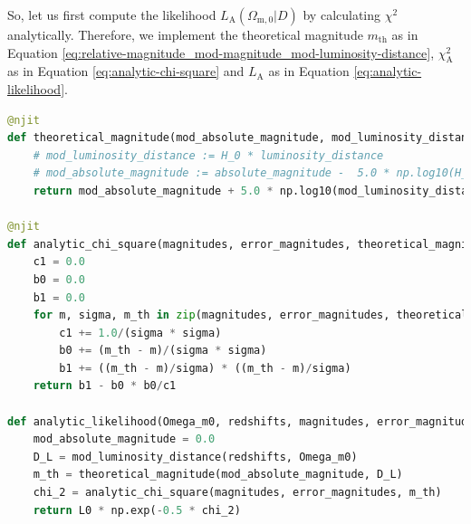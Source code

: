 \noindent So, let us first compute the likelihood $L_{\text{A}}(\Omega_{\text{m},0} \vert D)$ by calculating $\chi^2$ analytically. Therefore, we implement the theoretical magnitude $m_{\text{th}}$ as in Equation \eqref{eq:relative-magnitude_mod-magnitude_mod-luminosity-distance}, $\chi_{\text{A}}^{2}$ as in Equation \eqref{eq:analytic-chi-square} and $L_{\text{A}}$ as in Equation \eqref{eq:analytic-likelihood}.

\begin{lstlisting}[language=Python, caption={Function for $m_{\text{th}}(z, \mathcal{M}, \Omega_{\text{m},0})$, $\chi_{\text{A}}^2(\Omega_{\text{m},0} \vert D)$ and $L_{\text{A}}(\Omega_{\text{m},0} \vert D)$.}, label={lst:MWE-theoretical-magnitude-and-analytic-chi-square-and-analytic-likelihood}]
@njit
def theoretical_magnitude(mod_absolute_magnitude, mod_luminosity_distance):
    # mod_luminosity_distance := H_0 * luminosity_distance
    # mod_absolute_magnitude := absolute_magnitude -  5.0 * np.log10(H_0) + 25.0
    return mod_absolute_magnitude + 5.0 * np.log10(mod_luminosity_distance)

@njit
def analytic_chi_square(magnitudes, error_magnitudes, theoretical_magnitudes):
    c1 = 0.0
    b0 = 0.0
    b1 = 0.0
    for m, sigma, m_th in zip(magnitudes, error_magnitudes, theoretical_magnitudes):
        c1 += 1.0/(sigma * sigma)
        b0 += (m_th - m)/(sigma * sigma)
        b1 += ((m_th - m)/sigma) * ((m_th - m)/sigma)
    return b1 - b0 * b0/c1

def analytic_likelihood(Omega_m0, redshifts, magnitudes, error_magnitudes, L0):
    mod_absolute_magnitude = 0.0
    D_L = mod_luminosity_distance(redshifts, Omega_m0)
    m_th = theoretical_magnitude(mod_absolute_magnitude, D_L)
    chi_2 = analytic_chi_square(magnitudes, error_magnitudes, m_th)
    return L0 * np.exp(-0.5 * chi_2) 
\end{lstlisting}

